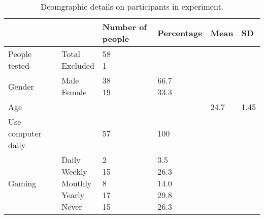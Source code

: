 \begin{table}[]
\centering
\vspace*{-2cm}
\caption{Deomgraphic details on participants in experiment.}
\label{demographicsTable}
\small
\begin{tabular}{llllll}
\toprule
                   &                                         & Number of people  & Percentage                              & Mean & SD   \\ \midrule
People tested      & \makecell[lt]{Total\\ Excluded}                       & \makecell[lt]{58\\ 1}           &                                         &      &      \\
Gender             & \makecell[lt]{Male\\ Female}                          & \makecell[lt]{38\\ 19}          & \makecell[lt]{66.7\\ 33.3}                        &      &      \\
Age                &                                         &                   &                                         & 24.7 & 1.45 \\
Use computer daily &                                         & 57                & 100                                   &      &      \\
Gaming             & \makecell[lt]{Daily\\ Weekly\\ Monthly\\ Yearly\\ Never} & \makecell[lt]{2\\ 15\\ 8\\ 17\\ 15} & \makecell[lt]{3.5\\ 26.3\\ 14.0\\ 29.8\\ 26.3} &      &   \\  \bottomrule
\end{tabular}
\end{table}